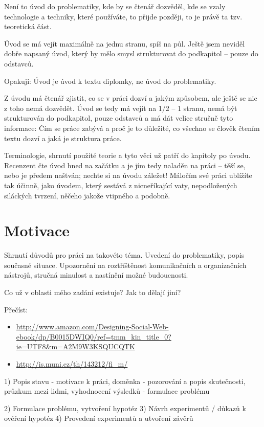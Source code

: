 \documentclass[12pt,oneside,final]{fithesis2}
\begin{document}
Není to úvod do problematiky, kde by se čtenář dozvěděl, kde se vzaly technologie a techniky, které používáte, to přijde později, to je právě ta tzv. teoretická část.

Úvod se má vejít maximálně na jednu stranu, spíš na půl. Ještě jsem neviděl dobře napsaný úvod, který by mělo smysl strukturovat do podkapitol – pouze do odstavců.

Opakuji: Úvod je úvod k textu diplomky, ne úvod do problematiky.

Z úvodu má čtenář zjistit, co se v práci dozví a jakým způsobem, ale ještě se nic z toho nemá dozvědět. Úvod se tedy má vejít na 1/2 – 1 stranu, nemá být strukturován do podkapitol, pouze odstavců a má dát velice stručně tyto informace: Čím se práce zabývá a proč je to důležité, co všechno se člověk čtením textu dozví a jaká je struktura práce.

Terminologie, shrnutí použité teorie a tyto věci už patří do kapitoly po úvodu. Recenzent čte úvod hned na začátku a je jím tedy naladěn na práci – těší se, nebo je předem naštván; nechte si na úvodu záležet! Máločím své práci ublížíte tak účinně, jako úvodem, který sestává z nicneříkající vaty, nepodložených siláckých tvrzení, něčeho jakože vtipného a podobně.

\chapter{Motivace}
Shrnutí důvodů pro práci na takovéto téma. Uvedení do problematiky, popis současné situace. Upozornění na roztříštěnost komunikačních a organizačních nástrojů, stručná minulost a nastínění možné budoucnosti.

Co už v oblasti mého zadání existuje? Jak to dělají jiní?

Přečíst:
\begin{itemize}
    \item \url{http://www.amazon.com/Designing-Social-Web-ebook/dp/B0015DWIQ0/ref=tmm_kin_title_0?ie=UTF8&m=A2M9W3KSQUCQTK}
    \item \url{http://is.muni.cz/th/143212/fi_m/}
\end{itemize}



1) Popis stavu
    - motivace k práci, doměnka
    - pozorování a popis skutečnosti, průzkum mezi lidmi, vyhodnocení výsledků
    - formulace problému

2) Formulace problému, vytvoření hypotéz
3) Návrh experimentů / důkazů k ověření hypotéz
4) Provedení experimentů a utvoření závěrů
\end{document}
